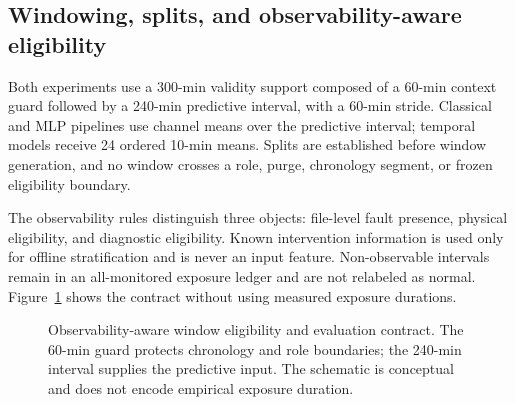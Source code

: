 \documentclass[preprint,12pt]{elsarticle}
\begin{document}
\subsection{Windowing, splits, and observability-aware eligibility}
Both experiments use a 300-min validity support composed of a 60-min context guard followed by a 240-min predictive interval, with a 60-min stride. Classical and MLP pipelines use channel means over the predictive interval; temporal models receive 24 ordered 10-min means. Splits are established before window generation, and no window crosses a role, purge, chronology segment, or frozen eligibility boundary.

The observability rules distinguish three objects: file-level fault presence, physical eligibility, and diagnostic eligibility. Known intervention information is used only for offline stratification and is never an input feature. Non-observable intervals remain in an all-monitored exposure ledger and are not relabeled as normal. Figure~\ref{fig:obs} shows the contract without using measured exposure durations.

\begin{figure}[H]
\centering
{}
\caption{Observability-aware window eligibility and evaluation contract. The 60-min guard protects chronology and role boundaries; the 240-min interval supplies the predictive input. The schematic is conceptual and does not encode empirical exposure duration.}
\label{fig:obs}
\end{figure}
\end{document}
